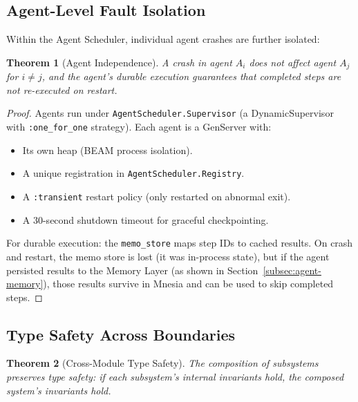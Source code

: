\documentclass[12pt,a4paper]{article}
\newtheorem{theorem}{Theorem}[section]
\theoremstyle{definition}
\begin{document}
\subsection{Agent-Level Fault Isolation}

Within the Agent Scheduler, individual agent crashes are further isolated:

\begin{theorem}[Agent Independence]\label{thm:agent-isolation}
A crash in agent $A_i$ does not affect agent $A_j$ for $i \neq j$, and the
agent's durable execution guarantees that completed steps are not re-executed
on restart.
\end{theorem}

\begin{proof}
Agents run under \texttt{AgentScheduler.Supervisor} (a DynamicSupervisor with
\texttt{:one\_for\_one} strategy). Each agent is a GenServer with:

\begin{itemize}
  \item Its own heap (BEAM process isolation).
  \item A unique registration in \texttt{AgentScheduler.Registry}.
  \item A \texttt{:transient} restart policy (only restarted on abnormal exit).
  \item A 30-second shutdown timeout for graceful checkpointing.
\end{itemize}

For durable execution: the \texttt{memo\_store} maps step IDs to cached results.
On crash and restart, the memo store is lost (it was in-process state), but
if the agent persisted results to the Memory Layer (as shown in
Section~\ref{subsec:agent-memory}), those results survive in Mnesia and can
be used to skip completed steps.
\end{proof}

\subsection{Type Safety Across Boundaries}

\begin{theorem}[Cross-Module Type Safety]\label{thm:type-safety}
The composition of subsystems preserves type safety: if each subsystem's internal
invariants hold, the composed system's invariants hold.
\end{theorem}
\end{document}
